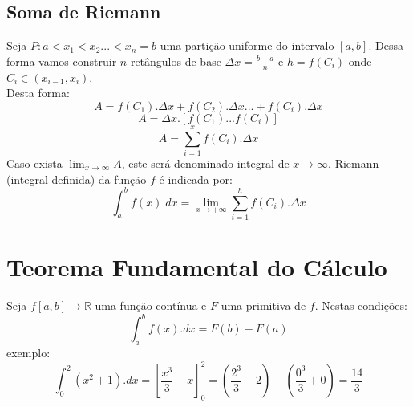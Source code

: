 \documentclass{article}
\begin{document}
		\subsection{Soma de Riemann}
			\begin{center}
			\end{center}
			Seja $P: a<x_1<x_2...<x_n=b$ uma partição uniforme do intervalo $[a,b]$. Dessa forma vamos construir $n$ retângulos de base $\Delta x = \frac{b-a}{n}$ e $h=f(C_i)$ onde $C_i \in (x_{i-1},x_i)$.\\
			Desta forma:
				$$A=f(C_1).\Delta x+f(C_2).\Delta x ... + f(C_i).\Delta x$$
				$$A = \Delta x.[f(C_1)...f(C_i)]$$
				$$A = \sum_{i=1}^{x}f(C_i).\Delta x$$
			Caso exista $\lim_{x \to \infty}A$, este será denominado integral de $x\to \infty$.
			Riemann (integral definida) da função $f$ é indicada por:
				$$\int_{a}^{b}f(x).dx = \lim_{x\to +\infty}\sum_{i=1}^{h}f(C_i).\Delta x$$
	\section{Teorema Fundamental do Cálculo}
		Seja $f[a,b]\to \mathbb{R}$ uma função contínua e $F$ uma primitiva de $f$. Nestas condições:
			$$\int_a^bf(x).dx = F(b)-F(a)$$
		exemplo:
			$$\int_0^2(x^2+1).dx=[\dfrac{x^3}{3}+x]_0^2=(\dfrac{2^3}{3}+2)-(\dfrac{0^3}{3}+0)=\dfrac{14}{3}$$
\end{document}
